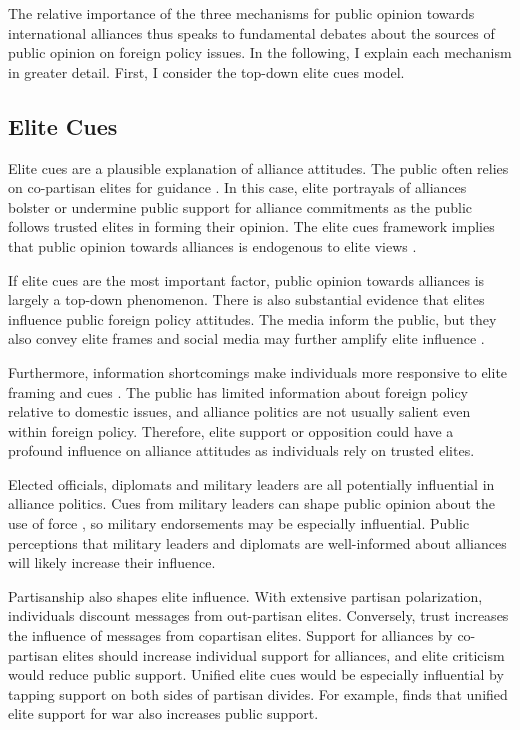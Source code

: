 \documentclass[12pt]{article}
\begin{document}
The relative importance of the three mechanisms for public opinion towards international alliances thus speaks to fundamental debates about the sources of public opinion on foreign policy issues.  
In the following, I explain each mechanism in greater detail. 
First, I consider the top-down elite cues model.


\subsection{Elite Cues} 

Elite cues are a plausible explanation of alliance attitudes. 
The public often relies on co-partisan elites for guidance \citep{Druckmanetal2013}. 
In this case, elite portrayals of alliances bolster or undermine public support for alliance commitments as the public follows trusted elites in forming their opinion. 
The elite cues framework implies that public opinion towards alliances is endogenous to elite views \citep{Druckman2014}.


If elite cues are the most important factor, public opinion towards alliances is largely a top-down phenomenon.
There is also substantial evidence that elites influence public foreign policy attitudes. 
The media inform the public, but they also convey elite frames \citep{BaumPotter2008} and social media may further amplify elite influence \citep{BaumPotter2019}.   


Furthermore, information shortcomings make individuals more responsive to elite framing and cues \citep{Druckman2001, Peterson2017}.  
The public has limited information about foreign policy relative to domestic issues, and alliance politics are not usually salient even within foreign policy. 
Therefore, elite support or opposition could have a profound influence on alliance attitudes as individuals rely on trusted elites. 


Elected officials, diplomats and military leaders are all potentially influential in alliance politics. 
Cues from military leaders can shape public opinion about the use of force \citep{Golbyetal2018}, so military endorsements may be especially influential. 
Public perceptions that military leaders and diplomats are well-informed about alliances will likely increase their influence. 


Partisanship also shapes elite influence.
With extensive partisan polarization, individuals discount messages from out-partisan elites. 
Conversely, trust increases the influence of messages from copartisan elites. 
Support for alliances by co-partisan elites should increase individual support for alliances, and elite criticism would reduce public support.  
Unified elite cues would be especially influential by tapping support on both sides of partisan divides.
For example, \citet{Berinsky2007} finds that unified elite support for war also increases public support. 
\end{document}
